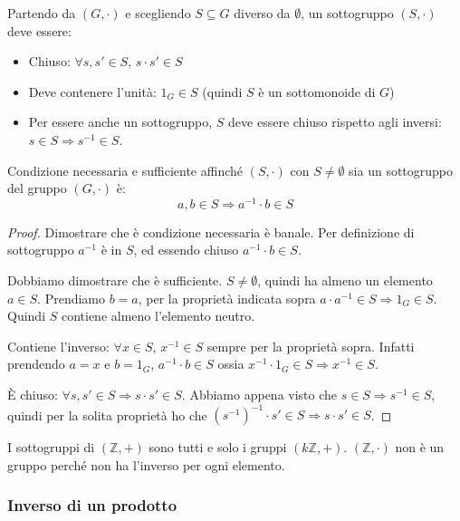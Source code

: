 \begin{defn}[Sottogruppo]
Partendo da $(G, \cdot)$ e scegliendo $S \subseteq G$ diverso da $\emptyset$, un sottogruppo $(S, \cdot)$ deve essere:
\begin{itemize}
    \item Chiuso: $\forall s, s' \in S$, $s \cdot s' \in S$
    \item Deve contenere l'unit\`a: $1_G \in S$ (quindi $S$ \`e un sottomonoide di $G$)
    \item Per essere anche un sottogruppo, $S$ deve essere chiuso rispetto agli inversi: $s \in S \Rightarrow s^{-1} \in S$.
\end{itemize}
\end{defn}
\begin{prop}
Condizione necessaria e sufficiente affinch\'e $(S, \cdot)$ con $S \neq \emptyset$ sia un sottogruppo del gruppo $(G, \cdot)$ \`e:
\[
a, b \in S \Rightarrow a^{-1} \cdot  b \in S
\]
\end{prop}
\begin{proof}
Dimostrare che \`e condizione necessaria \`e banale. Per definizione di sottogruppo $a^{-1}$ \`e in $S$, ed essendo chiuso $a^{-1} \cdot b \in S$.

Dobbiamo dimostrare che \`e sufficiente. $S \neq \emptyset$, quindi ha almeno un elemento $a \in S$. Prendiamo $b = a $, per la propriet\`a indicata sopra $a \cdot a^{-1} \in S \Rightarrow 1_G \in S$. Quindi $S$ contiene almeno l'elemento neutro.

Contiene l'inverso: $\forall x \in S $, $ x^{-1} \in S$ sempre per la propriet\`a sopra. Infatti prendendo $a = x$ e $b = 1_G$, $a^{-1} \cdot b \in S$ ossia $x^{-1} \cdot 1_G \in S \Rightarrow x^{-1} \in S$.

\`E chiuso: $\forall s, s' \in S \Rightarrow s \cdot s' \in S$. Abbiamo appena visto che $s \in S \Rightarrow s^{-1} \in S$, quindi per la solita propriet\`a ho che $(s^{-1})^{-1} \cdot s' \in S \Rightarrow s \cdot s' \in S$.
\end{proof}


I sottogruppi di $(\mathbb{Z}, +)$ sono tutti e solo i gruppi $(k \mathbb{Z}, +)$. $(\mathbb{Z}, \cdot)$ non \`e un gruppo perch\'e non ha l'inverso per ogni elemento.

\subsubsection{Inverso di un prodotto}

